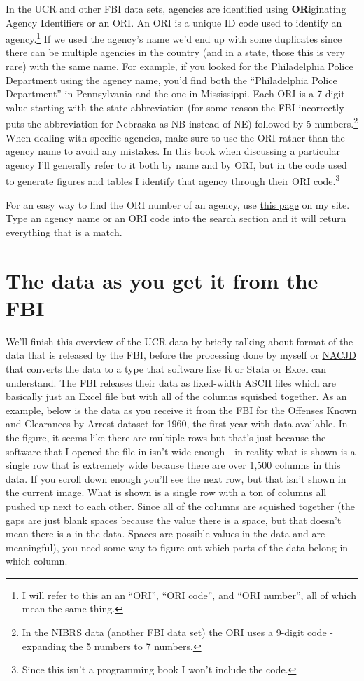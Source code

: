 \documentclass[
  12pt,
  openany]{book}
\begin{document}
In the UCR and other FBI data sets, agencies are identified using \textbf{OR}iginating Agency \textbf{I}dentifiers or an ORI. An ORI is a unique ID code used to identify an agency.\footnote{I will refer to this an an ``ORI'', ``ORI code'', and ``ORI number'', all of which mean the same thing.} If we used the agency's name we'd end up with some duplicates since there can be multiple agencies in the country (and in a state, those this is very rare) with the same name. For example, if you looked for the Philadelphia Police Department using the agency name, you'd find both the ``Philadelphia Police Department'' in Pennsylvania and the one in Mississippi. Each ORI is a 7-digit value starting with the state abbreviation (for some reason the FBI incorrectly puts the abbreviation for Nebraska as NB instead of NE) followed by 5 numbers.\footnote{In the NIBRS data (another FBI data set) the ORI uses a 9-digit code - expanding the 5 numbers to 7 numbers.} When dealing with specific agencies, make sure to use the ORI rather than the agency name to avoid any mistakes. In this book when discussing a particular agency I'll generally refer to it both by name and by ORI, but in the code used to generate figures and tables I identify that agency through their ORI code.\footnote{Since this isn't a programming book I won't include the code.}

For an easy way to find the ORI number of an agency, use \href{http://crimedatatool.com/crosswalk.html}{this page} on my site. Type an agency name or an ORI code into the search section and it will return everything that is a match.

\hypertarget{the-data-as-you-get-it-from-the-fbi}{%
\section{The data as you get it from the FBI}\label{the-data-as-you-get-it-from-the-fbi}}

We'll finish this overview of the UCR data by briefly talking about format of the data that is released by the FBI, before the processing done by myself or \href{https://www.icpsr.umich.edu/web/pages/NACJD/index.html}{NACJD} that converts the data to a type that software like R or Stata or Excel can understand. The FBI releases their data as fixed-width ASCII files which are basically just an Excel file but with all of the columns squished together. As an example, below is the data as you receive it from the FBI for the Offenses Known and Clearances by Arrest dataset for 1960, the first year with data available. In the figure, it seems like there are multiple rows but that's just because the software that I opened the file in isn't wide enough - in reality what is shown is a single row that is extremely wide because there are over 1,500 columns in this data. If you scroll down enough you'll see the next row, but that isn't shown in the current image. What is shown is a single row with a ton of columns all pushed up next to each other. Since all of the columns are squished together (the gaps are just blank spaces because the value there is a space, but that doesn't mean there is a in the data. Spaces are possible values in the data and are meaningful), you need some way to figure out which parts of the data belong in which column.
\end{document}
